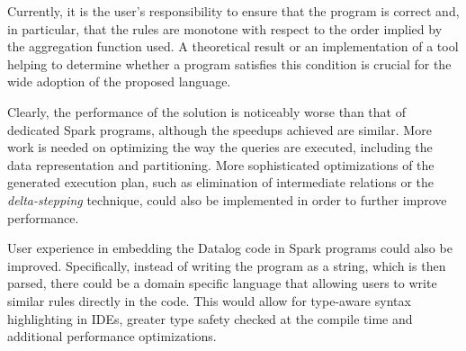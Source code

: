 Currently, it is the user's responsibility to ensure that the program is correct and, in particular, that the rules are monotone with respect to the order implied by the aggregation function used. A theoretical result or an implementation of a tool helping to determine whether a program satisfies this condition is crucial for the wide adoption of the proposed language.

Clearly, the performance of the solution is noticeably worse than that of dedicated Spark programs, although the speedups achieved are similar. More work is needed on optimizing the way the queries are executed, including the data representation and partitioning. More sophisticated optimizations of the generated execution plan, such as elimination of intermediate relations or the \emph{delta-stepping} technique, could also be implemented in order to further improve performance.

User experience in embedding the Datalog code in Spark programs could also be improved. Specifically, instead of writing the program as a string, which is then parsed, there could be a domain specific language that allowing users to write similar rules directly in the code. This would allow for type-aware syntax highlighting in IDEs, greater type safety checked at the compile time and additional performance optimizations.


